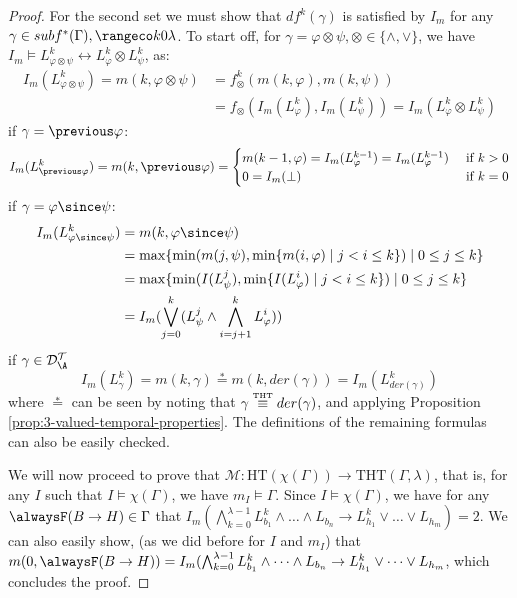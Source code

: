 \begin{proof}
  For the second set we must show that $df^k(\gamma)$ is satisfied by
  $I_m$ for any $\gamma \in subf^*(\Gamma), \kinlambda$. To start off,
  for $\gamma=\varphi \otimes \psi, \otimes \in \{ \land, \lor \}$, we
  have
  $I_m \models L^k_{\varphi \otimes \psi} \leftrightarrow L^k_\varphi
  \otimes L^k_\psi$, as:
  \begin{align*}
  I_m(L^k_{\varphi \otimes \psi}) = m(k,\varphi \otimes \psi) &= f_{\otimes}^k(m(k,\varphi),m(k,\psi))\\
  &= f_{\otimes}(I_m(L^k_\varphi),I_m(L^k_\psi)) = I_m(L^k_{\varphi} \otimes L^k_{\psi})
  \end{align*}
  if $\gamma=\previous \varphi$:
  $$
  I_m(L^k_{\previous \varphi}) = m(k,\previous \varphi) = \begin{cases}
    m(k-1,\varphi)=I_m(L^{k-1}_\varphi)=I_m(L^{k-1}_\varphi) &\text{ if } k > 0\\
    0=I_m(\bot) &\text{ if } k = 0
    \end{cases}
  $$
  if $\gamma=\varphi \since \psi$:
  \begin{align*}
  I_m(L^k_{\varphi \since \psi}) 
    &= m(k,\varphi \since \psi)\\ 
    &= \max \{\min (m(j, \psi), \min \{m(i, \varphi) \mid j<i \leq k\}) \mid 0 \leq j \leq k\}\\
    &= \max \{\min (I(L^j_{\psi}), \min \{I(L^i_{\varphi}) \mid j<i \leq k\}) \mid 0 \leq j \leq k\} \\
    &= I_m(\bigvee_{j=0}^{k}(L_\psi^j \wedge \bigwedge_{i=j+1}^{k}L_{\varphi}^i))
  \end{align*}
  if $\gamma \in \langdat$
  $$
  I_m(L^k_{\gamma}) = m(k,\gamma) \stackrel{*}{=} m(k,der(\gamma)) = I_m(L^k_{der(\gamma)})
  $$
  where $\stackrel{*}{=}$ can be seen by noting that
  $\gamma \stackrel{\normalfont\mbox{\tiny THT}}{\equiv} der(\gamma)$, and applying Proposition
  \ref{prop:3-valued-temporal-properties}. The definitions of the
  remaining formulas can also be easily checked.

  We will now proceed to prove that
  $\mathcal{M}: \text{HT}(\chi(\Gamma)) \rightarrow
  \text{THT}(\Gamma,\lambda)$, that is, for any $I$ such that
  $I \models \chi(\Gamma)$, we have $m_I \models \Gamma$. Since
  $I \models \chi(\Gamma)$, we have for any
  $\tempruleshort \in \Gamma$ that
  $I_m(\bigwedge_{k=0}^{\lambda-1} L_{b_1}^k \land \dots \land L_{b_n}
  \rightarrow L_{h_1}^k \lor \dots \lor L_{h_m})=2$. We can also
  easily show, (as we did before for $I$ and $m_I$) that
  $m(0,\tempruleshort)=I_m(\bigwedge_{k=0}^{\lambda-1} L_{b_1}^k \land
  \dots \land L_{b_n} \rightarrow L_{h_1}^k \lor \dots \lor L_{h_m}$,
  which concludes the proof.
\end{proof}

